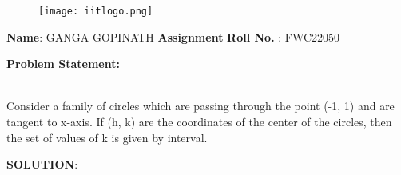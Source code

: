 \documentclass[10pt,a4paper]{report}
\begin{document}
\begin{figure*}[!tbp]
  \centering
  \begin{minipage}[b]{0.4\textwidth}
  \texttt{[image: iitlogo.png]} 
  \end{minipage}\vspace{0.2cm}
\end{figure*}
\raggedright \textbf{Name}:\hspace{1mm} GANGA GOPINATH\hspace{3cm} \Large \textbf{ Assignment}\hspace{2.5cm} %
\normalsize \textbf{Roll No.} :\hspace{1mm} FWC22050\vspace{1cm}
\begin{multicols}{2}

\raggedright \textbf{Problem Statement:}\vspace{2mm}
\raggedright \\Consider a family of circles which are passing through the point (-1, 1) and are tangent to x-axis. If (h, k) are the coordinates of the center of the circles, then the set of values of k is given by interval.\\
\vspace{5mm}
\raggedright \textbf{SOLUTION}:\vspace{2mm}\\


\end{multicols}
\end{document}
